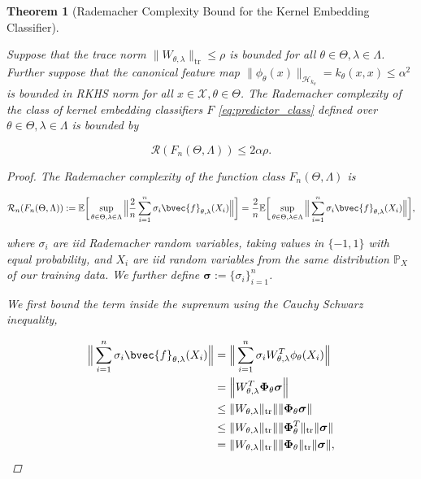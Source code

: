 \documentclass{article}
\newtheorem{theorem}{Theorem}[section]
\begin{document}
		\begin{theorem}[Rademacher Complexity Bound for the Kernel Embedding Classifier]
		\label{thm:rademacher_complexity_bound}
		
			Suppose that the trace norm $\| W_{\theta, \lambda} \|_{\mathrm{tr}} \leq \rho$ is bounded for all $\theta \in \Theta, \lambda \in \Lambda$. Further suppose that the canonical feature map $\| \phi_{\theta}(x) \|_{\mathcal{H}_{k_{\theta}}} = k_{\theta}(x, x) \leq \alpha^{2}$ is bounded in RKHS norm for all $x \in \mathcal{X}, \theta \in \Theta$. The Rademacher complexity of the class of kernel embedding classifiers $F$ \eqref{eq:predictor_class} defined over $\theta \in \Theta, \lambda \in \Lambda$ is bounded by
				
			\begin{equation}
				\mathcal{R}(F_{n}(\Theta, \Lambda)) \leq 2 \alpha \rho.
			\label{eq:rademacher_complexity_bound}
			\end{equation}
	
			\begin{proof}
			
				The Rademacher complexity \citep[Definition 2]{bartlett2002rademacher} of the function class $F_{n}(\Theta, \Lambda)$ is 
				
				\begin{equation}
					\mathcal{R}_{n}(F_{n}(\Theta, \Lambda)) := \mathbb{E}\bigg[\sup_{\theta \in \Theta, \lambda \in \Lambda} \Big\| \frac{2}{n} \sum_{i = 1}^{n} \sigma_{i}\bvec{f}_{\theta, \lambda}(X_{i}) \Big\|\bigg] = \frac{2}{n} \mathbb{E}\bigg[\sup_{\theta \in \Theta, \lambda \in \Lambda} \Big\| \sum_{i = 1}^{n} \sigma_{i}\bvec{f}_{\theta, \lambda}(X_{i}) \Big\|\bigg],
				\end{equation}
				
				where $\sigma_{i}$ are \textit{iid} Rademacher random variables, taking values in $\{-1, 1\}$ with equal probability, and $X_{i}$ are \textit{iid} random variables from the same distribution $\mathbb{P}_{X}$ of our training data. We further define $\bm{\sigma} := \{\sigma_{i}\}_{i = 1}^{n}$.
				
				We first bound the term inside the suprenum using the Cauchy Schwarz inequality,
				
				\begin{equation}
					\begin{aligned}
						\Big\| \sum_{i = 1}^{n} \sigma_{i}\bvec{f}_{\theta, \lambda}(X_{i}) \Big\| &= \Big\| \sum_{i = 1}^{n} \sigma_{i} W_{\theta, \lambda}^{T} \phi_{\theta}(X_{i}) \Big\| \\
						&= \Big\| W_{\theta, \lambda}^{T} \bm{\Phi}_{\theta} \bm{\sigma} \Big\| \\
						&\leq \| W_{\theta, \lambda} \|_{\mathrm{tr}} \| \| \bm{\Phi}_{\theta} \bm{\sigma} \| \\
						&\leq \| W_{\theta, \lambda} \|_{\mathrm{tr}} \| \| \bm{\Phi}_{\theta}^{T} \|_{\mathrm{tr}} \| \bm{\sigma} \| \\
						&= \| W_{\theta, \lambda} \|_{\mathrm{tr}} \| \| \bm{\Phi}_{\theta} \|_{\mathrm{tr}} \| \bm{\sigma} \|,
					\end{aligned}
				\end{equation}
				

\end{proof}
\end{theorem}
\end{document}

